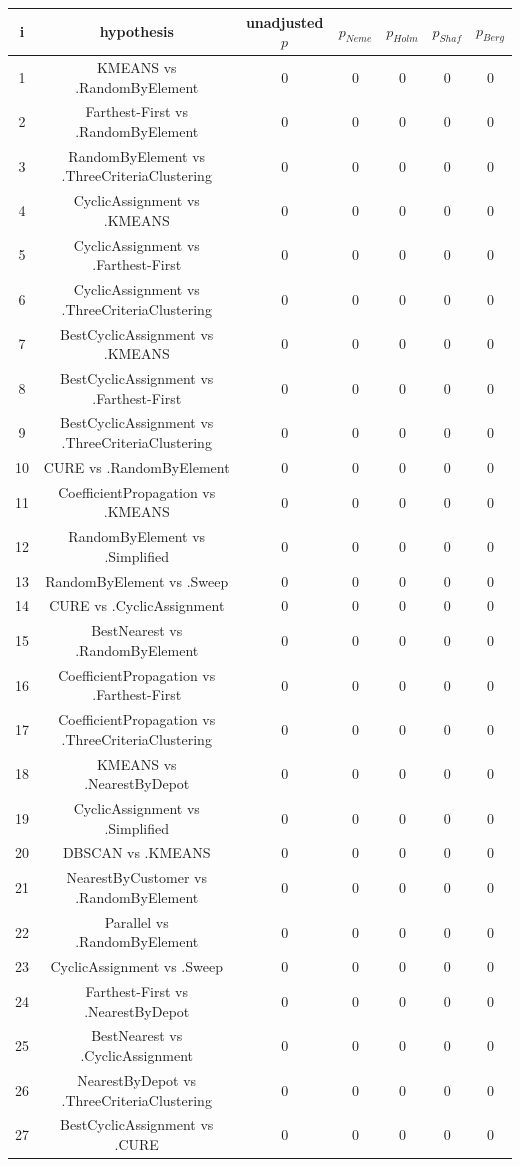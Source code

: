 \documentclass[a4paper,10pt]{article}
\begin{document}
\begin{landscape}
\begin{table}[!htp]
\centering\scriptsize
\begin{tabular}{ccccccc}
i&hypothesis&unadjusted $p$&$p_{Neme}$&$p_{Holm}$&$p_{Shaf}$&$p_{Berg}$\\
\hline1&KMEANS vs .RandomByElement&0&0&0&0&0\\
2&Farthest-First vs .RandomByElement&0&0&0&0&0\\
3&RandomByElement vs .ThreeCriteriaClustering&0&0&0&0&0\\
4&CyclicAssignment vs .KMEANS&0&0&0&0&0\\
5&CyclicAssignment vs .Farthest-First&0&0&0&0&0\\
6&CyclicAssignment vs .ThreeCriteriaClustering&0&0&0&0&0\\
7&BestCyclicAssignment vs .KMEANS&0&0&0&0&0\\
8&BestCyclicAssignment vs .Farthest-First&0&0&0&0&0\\
9&BestCyclicAssignment vs .ThreeCriteriaClustering&0&0&0&0&0\\
10&CURE vs .RandomByElement&0&0&0&0&0\\
11&CoefficientPropagation vs .KMEANS&0&0&0&0&0\\
12&RandomByElement vs .Simplified&0&0&0&0&0\\
13&RandomByElement vs .Sweep&0&0&0&0&0\\
14&CURE vs .CyclicAssignment&0&0&0&0&0\\
15&BestNearest vs .RandomByElement&0&0&0&0&0\\
16&CoefficientPropagation vs .Farthest-First&0&0&0&0&0\\
17&CoefficientPropagation vs .ThreeCriteriaClustering&0&0&0&0&0\\
18&KMEANS vs .NearestByDepot&0&0&0&0&0\\
19&CyclicAssignment vs .Simplified&0&0&0&0&0\\
20&DBSCAN vs .KMEANS&0&0&0&0&0\\
21&NearestByCustomer vs .RandomByElement&0&0&0&0&0\\
22&Parallel vs .RandomByElement&0&0&0&0&0\\
23&CyclicAssignment vs .Sweep&0&0&0&0&0\\
24&Farthest-First vs .NearestByDepot&0&0&0&0&0\\
25&BestNearest vs .CyclicAssignment&0&0&0&0&0\\
26&NearestByDepot vs .ThreeCriteriaClustering&0&0&0&0&0\\
27&BestCyclicAssignment vs .CURE&0&0&0&0&0\\

\end{tabular}
\end{table}
\end{landscape}
\end{document}

